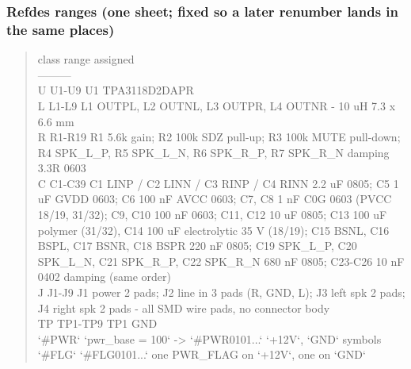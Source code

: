 \documentclass[11pt]{article}
\begin{document}
\subsubsection*{Refdes ranges (one sheet; fixed so a later renumber lands in the same places)}
\begin{quote}\small\ttfamily\raggedright
\textbar{} class \textbar{} range \textbar{} assigned \textbar{}\\
\textbar{}---\textbar{}---\textbar{}---\textbar{}\\
\textbar{} U \textbar{} U1-U9 \textbar{} U1 TPA3118D2DAPR \textbar{}\\
\textbar{} L \textbar{} L1-L9 \textbar{} L1 OUTPL, L2 OUTNL, L3 OUTPR, L4 OUTNR - 10 uH 7.3 x 6.6 mm \textbar{}\\
\textbar{} R \textbar{} R1-R19 \textbar{} R1 5.6k gain; R2 100k SDZ pull-up; R3 100k MUTE pull-down; R4 SPK\_L\_P, R5 SPK\_L\_N, R6 SPK\_R\_P, R7 SPK\_R\_N damping 3.3R 0603 \textbar{}\\
\textbar{} C \textbar{} C1-C39 \textbar{} C1 LINP / C2 LINN / C3 RINP / C4 RINN 2.2 uF 0805; C5 1 uF GVDD 0603; C6 100 nF AVCC 0603; C7, C8 1 nF C0G 0603 (PVCC 18/19, 31/32); C9, C10 100 nF 0603; C11, C12 10 uF 0805; C13 100 uF polymer (31/32), C14 100 uF electrolytic 35 V (18/19); C15 BSNL, C16 BSPL, C17 BSNR, C18 BSPR 220 nF 0805; C19 SPK\_L\_P, C20 SPK\_L\_N, C21 SPK\_R\_P, C22 SPK\_R\_N 680 nF 0805; C23-C26 10 nF 0402 damping (same order) \textbar{}\\
\textbar{} J \textbar{} J1-J9 \textbar{} J1 power 2 pads; J2 line in 3 pads (R, GND, L); J3 left spk 2 pads; J4 right spk 2 pads - all SMD wire pads, no connector body \textbar{}\\
\textbar{} TP \textbar{} TP1-TP9 \textbar{} TP1 GND \textbar{}\\
\textbar{} `\#PWR` \textbar{} `pwr\_base = 100` -\textgreater{} `\#PWR0101...` \textbar{} `+12V`, `GND` symbols \textbar{}\\
\textbar{} `\#FLG` \textbar{} `\#FLG0101...` \textbar{} one PWR\_FLAG on `+12V`, one on `GND` \textbar{}
\end{quote}
\end{document}
